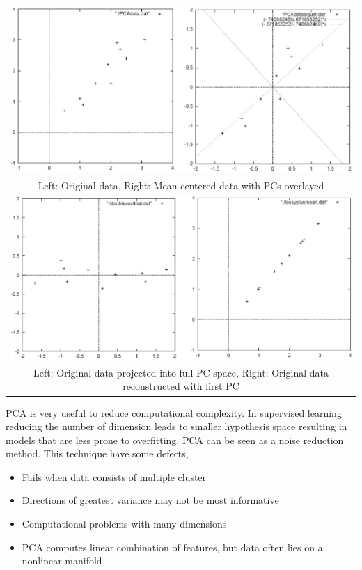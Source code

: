 \documentclass[main.tex]{subfiles}
\begin{document}
\begin{center}
    \begin{tabular}{c}
        \includegraphics[width=140mm]{img/PAC_1.PNG}                                                       \\
        Left: Original data, Right: Mean centered data with PCs overlayed                                  \\[6pt]
        \includegraphics[width=140mm]{img/PAC_2.PNG}                                                       \\
        Left: Original data projected into full PC space, Right: Original data reconstructed with first PC \\[6pt]
    \end{tabular}
\end{center}

PCA is very useful to reduce computational complexity. In supervised learning reducing the number of dimension leads to smaller hypothesis space resulting in models that are less prone to overfitting. PCA can be seen as a noise reduction method.
This technique have some defects,
\begin{itemize}
    \item Fails when data consists of multiple cluster
    \item Directions of greatest variance may not be most informative
    \item Computational problems with many dimensions
    \item PCA computes linear combination of features, but data often lies on a nonlinear manifold
\end{itemize}
\end{document}
